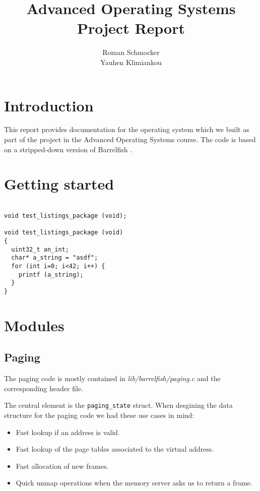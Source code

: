 \documentclass[a4paper,10pt]{article}
\title{Advanced Operating Systems \\ Project Report}
\author{Roman Schmocker \\ Yauhen Klimiankou}
\newcommand{\filepath}[1]{\emph{ #1}}
\begin{document}
\maketitle


\section{Introduction}

This report provides documentation for the operating system which we built as part of the project in the Advanced Operating Systems course.
The code is based on a stripped-down version of Barrelfish \cite {web:barrelfish}.


\section{Getting started}

\begin{lstlisting}

void test_listings_package (void);

void test_listings_package (void)
{
  uint32_t an_int;
  char* a_string = "asdf";
  for (int i=0; i<42; i++) {
    printf (a_string);
  }
}
\end{lstlisting}


\section {Modules}

\subsection{Paging}

The paging code is mostly contained in \filepath{lib/barrelfish/paging.c} and the corresponding header file.

The central element is the \lstinline!paging_state! struct.
When desgining the data structure for the paging code we had these use cases in mind:

\begin{itemize}
 \item Fast lookup if an address is valid.
 \item Fast lookup of the page tables associated to the virtual address.
 \item Fast allocation of new frames.
 \item Quick unmap operations when the memory server asks us to return a frame.
\end{itemize}
\end{document}
